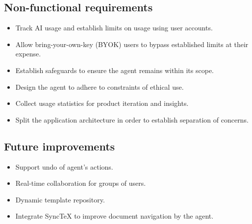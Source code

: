\subsection{Non-functional requirements}

\begin{itemize}
    \item Track AI usage and establish limits on usage using user accounts.
    \item Allow bring-your-own-key (BYOK) users to bypass established limits at their expense.
    \item Establish safeguards to ensure the agent remains within its scope.
    \item Design the agent to adhere to constraints of ethical use.
    \item Collect usage statistics for product iteration and insights.
    \item Split the application architecture in order to establish separation of concerns.
\end{itemize}

\subsection{Future improvements}

\begin{itemize}
    \item Support undo of agent's actions.
    \item Real-time collaboration for groups of users.
    \item Dynamic template repository.
    \item Integrate SyncTeX \cite{jlaurens_synctex} to improve document navigation by the agent.
\end{itemize}
